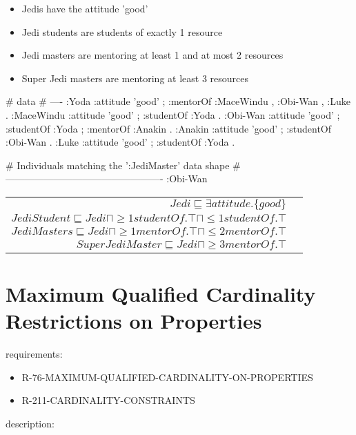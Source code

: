 \documentclass{llncs}
\newenvironment{DL}{
	\begin{center}
  \begin{tabular}{r l}

}{
  \end{tabular}
	\end{center}
}
\begin{document}
\begin{itemize}
	\item Jedis have the attitude 'good'
	\item Jedi students are students of exactly 1 resource
	\item Jedi masters are mentoring at least 1 and at most 2 resources
	\item Super Jedi masters are mentoring at least 3 resources  
\end{itemize}
\begin{ex}
# data
# ----
:Yoda 
    :attitude 'good' ;
    :mentorOf :MaceWindu , :Obi-Wan , :Luke .
:MaceWindu
    :attitude 'good' ;
    :studentOf :Yoda .
:Obi-Wan 
    :attitude 'good' ;
    :studentOf :Yoda ;
    :mentorOf :Anakin .
:Anakin
    :attitude 'good' ; 
    :studentOf :Obi-Wan .
:Luke
    :attitude 'good' ;
    :studentOf :Yoda .
\end{ex}

\begin{ex}
# Individuals matching the ’:JediMaster’ data shape
# -------------------------------------------------
:Obi-Wan
\end{ex}

\begin{DL}
$Jedi \sqsubseteq \exists attitude.\{good\} $\\
$JediStudent \sqsubseteq Jedi \sqcap \geq1 studentOf.\top \sqcap \leq1 studentOf.\top$ \\
$JediMasters \sqsubseteq Jedi \sqcap \geq1 mentorOf.\top \sqcap \leq2 mentorOf.\top $\\
$SuperJediMaster \sqsubseteq Jedi \sqcap  \geq3 mentorOf.\top $
\end{DL}

\section{Maximum Qualified Cardinality Restrictions on Properties}

requirements:

\begin{itemize}
	\item R-76-MAXIMUM-QUALIFIED-CARDINALITY-ON-PROPERTIES
	\item R-211-CARDINALITY-CONSTRAINTS
\end{itemize}

description:
\end{document}
